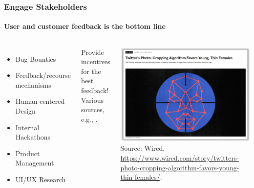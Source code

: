 \documentclass[11pt,
               aspectratio=169,
               hyperref={colorlinks}
               ]{beamer}
\begin{document}
		\begin{frame}
			
			\frametitle{Engage Stakeholders}
			\framesubtitle{User and customer feedback is the bottom line}
			
			\begin{columns}
				\vspace{-5pt}
				\begin{itemize}
					\item Bug Bounties
					\item Feedback/recourse mechanisms
					\item Human-centered Design
					\item Internal Hackathons
					\item Product Management
					\item UI/UX Research
				\end{itemize}
				\noindent Provide incentives for the best feedback!\\
				\vspace{5pt}
				\scriptsize{Various sources, e.g., \cite{schwartz2022towards}.}

				
				
				\centering
				\newline
				\includegraphics[width=\textwidth]{../img/engage.png} 
				\newline
				\tiny{Source: Wired, \url{https://www.wired.com/story/twitters-photo-cropping-algorithm-favors-young-thin-females/}.}
			\end{columns}
					
		\end{frame}
		
\end{document}
